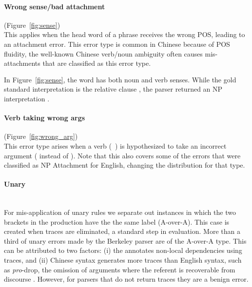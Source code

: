 \paragraph{Wrong sense/bad attachment} (Figure~\ref{fig:sense}) \\
This applies when the head word of a phrase receives the wrong POS, leading to an attachment error.
This error type is common in Chinese because of POS fluidity, \myeg the well-known Chinese verb/noun ambiguity often causes mis-attachments that are classified as this error type.

In Figure~\ref{fig:sense}, the word \mbox{} has both noun and
verb senses. While the gold standard interpretation is the relative clause
\mbox{}, the parser returned an NP
interpretation \mbox{}.

\paragraph{Verb taking wrong args} (Figure~\ref{fig:wrong_arg}) \\
This error type
arises when a verb \mbox{(\myeg~)} is hypothesized to take
an incorrect argument (\mbox{} instead of
\mbox{}).  Note that this also covers some of the errors
that were classified as NP Attachment for English, changing
the distribution for that type.

\begin{figure}
\begin{minipage}[b]{0.45\textwidth}
\centering

\end{minipage}\hfill
\begin{minipage}[b]{0.5\textwidth}
\centering

\end{minipage}
\end{figure}

\paragraph{Unary} \strut \\
For mis-application of unary rules we separate out instances in which the two brackets in the production have the the same label (A-over-A).
This case is created when traces are eliminated, a standard step in evaluation.
More than a third of unary errors made by the Berkeley parser are of the A-over-A type.
This can be attributed to two factors: (i) the \pctb annotates non-local dependencies using traces, and (ii) Chinese syntax generates more traces than English syntax, such as \emph{pro}-drop, the omission of arguments where the referent is recoverable from discourse \parencite{Guo-Wang-VanGenabith:2007:EMNLP}.
However, for parsers that do not return traces they are a benign error.

